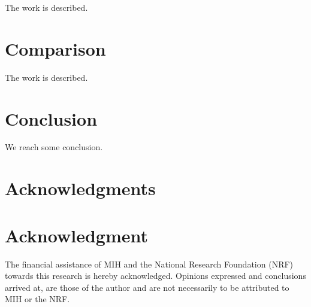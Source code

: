 \documentclass[10pt,a4paper,conference]{IEEEtran}
\begin{document}
The work is described.


\section{Comparison}
\label{comparison}

The work is described.

\section{Conclusion}
\label{conclusion}

We reach some conclusion.

\ifCLASSOPTIONcompsoc
  \section*{Acknowledgments}
\else
  \section*{Acknowledgment}
\fi

The financial assistance of MIH and the National Research Foundation (NRF) towards this research is hereby acknowledged. Opinions expressed and
conclusions arrived at, are those of the author and are not necessarily to be attributed to MIH or the NRF.




\end{document}
